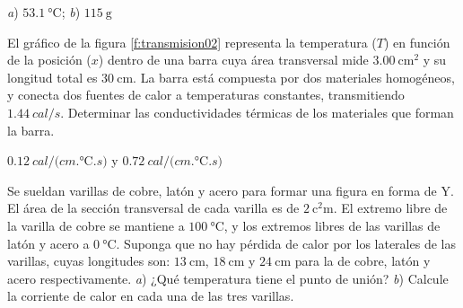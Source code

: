 \begin{Answer}
	\begin{minipage}[t]{.4\textwidth}
    \textit{a}) $\SI{53.1}{\celsius}$; \textit{b}) $\SI{115}{\gram}$
  \end{minipage}
\end{Answer}
%
\begin{Exercise}\label{p:transmision02}
  El gráfico de la figura \ref{f:transmision02} representa la temperatura ($T$) en función de la posición ($x$) dentro de una barra cuya área transversal mide $\SI{3.00}{\centi\metre\squared}$ y su longitud total es $\SI{30}{\centi\metre}$. La barra está compuesta por dos materiales homogéneos, y conecta dos fuentes de calor a temperaturas constantes, transmitiendo $\SI{1.44}{cal/s}$. Determinar las conductividades térmicas de los materiales que forman la barra.
\end{Exercise}
\begin{Answer}
	\begin{minipage}[t]{.4\textwidth}
    $\SI{0.12}{cal/(cm.\celsius.s)}$ y $\SI{0.72}{cal/(cm.\celsius.s)}$
  \end{minipage}
\end{Answer}
%
\begin{center}
\end{center}
%
\begin{Exercise}
  Se sueldan varillas de cobre, latón y acero para formar una figura en forma de Y. El área de la sección transversal de cada varilla es de $\SI{2}{\square\centi\metre}$. El extremo libre de la varilla de cobre se mantiene a $\SI{100}{\celsius}$, y los extremos libres de las varillas de latón y acero a $\SI{0}{\celsius}$. Suponga que no hay pérdida de calor por los laterales de las varillas, cuyas longitudes son: $\SI{13}{\centi\metre}$, $\SI{18}{\centi\metre}$ y $\SI{24}{\centi\metre}$ para la de cobre, latón y acero respectivamente. \textit{a}) ¿Qué temperatura tiene el punto de unión? \textit{b}) Calcule la corriente de calor en cada una de las tres varillas.
\end{Exercise}
